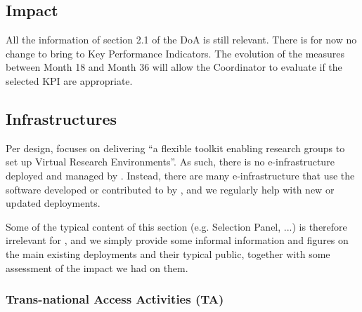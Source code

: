 \documentclass{deliverablereport}
\begin{document}
  \subsection{Impact}

  All the information of section 2.1 of the DoA is still relevant. There is for now no
  change to bring to Key Performance Indicators. The evolution of the measures between
  Month 18 and Month 36 will allow the Coordinator to evaluate if the selected KPI are
  appropriate.

\subsection{Infrastructures}

Per design, \ODK focuses on delivering ``a flexible toolkit enabling
research groups to set up Virtual Research Environments''. As such,
there is no e-infrastructure deployed and managed by \ODK. Instead,
there are many e-infrastructure that use the software developed or
contributed to by \ODK, and we regularly help with new or updated
deployments.

Some of the typical content of this section (e.g. Selection Panel,
...) is therefore irrelevant for \ODK, and we simply provide some
informal information and figures on the main existing deployments and
their typical public, together with some assessment of the impact we
had on them.


  \subsubsection{Trans-national Access Activities (TA)}


\end{document}
